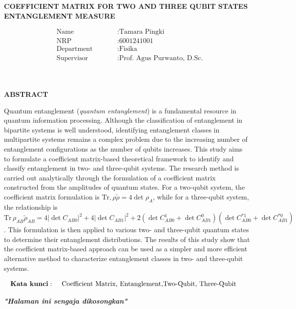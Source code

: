 \begin{center}
	\large{\textbf{COEFFICIENT MATRIX FOR TWO AND THREE QUBIT STATES ENTANGLEMENT MEASURE}}
\end{center}
\begin{minipage}{4cm}
	\begin{align*}
		&\text{Name} \qquad &&: \text{Tamara Pingki} \\
		&\text{NRP} \qquad &&: \text{6001241001} \\
		&\text{Department} \qquad &&: \text{Fisika} \\
		&\text{Supervisor} \qquad &&: \text{Prof. Agus Purwanto, D.Sc.} \\
	\end{align*}
\end{minipage} \\
\begin{center}
	\large\textbf{ABSTRACT} \\  
\end{center}
Quantum entanglement (\textit{quantum entanglement}) is a fundamental resource in quantum information processing. Although the classification of entanglement in bipartite systems is well understood, identifying entanglement classes in multipartite systems remains a complex problem due to the increasing number of entanglement configurations as the number of qubits increases. This study aims to formulate a coefficient matrix-based theoretical framework to identify and classify entanglement in two- and three-qubit systems. The research method is carried out analytically through the formulation of a coefficient matrix constructed from the amplitudes of quantum states. For a two-qubit system, the coefficient matrix formulation is $\mathrm{Tr},\rho \tilde{\rho} = 4 \det \rho_A$, while for a three-qubit system, the relationship is $\mathrm{Tr}\,\rho_{AB} \tilde{\rho}_{AB}= 4 |\det C_{AB0}|^2 + 4 |\det C_{AB1}|^2 + 2 (\det C_{AB0}^1 + \det C_{AB1}^0)(\det C^{*1}_{AB0} + \det C^{*0}_{AB1})$. This formulation is then applied to various two- and three-qubit quantum states to determine their entanglement distributions. The results of this study show that the coefficient matrix-based approach can be used as a simpler and more efficient alternative method to characterize entanglement classes in two- and three-qubit systems.

\noindent
\begin{minipage}{1cm}
	\begin{align*}
		\text{\textbf{Kata kunci}}:\hspace{5mm}&\text{Coefficient Matrix, Entanglement,Two-Qubit, Three-Qubit}%
	\end{align*}
\end{minipage}


\newpage
\thispagestyle{empty}
\begin{center}
	\vspace*{\fill}
	\textit{\textbf{"Halaman ini sengaja dikosongkan"}}
	\vspace*{\fill}
\end{center}
\pagebreak